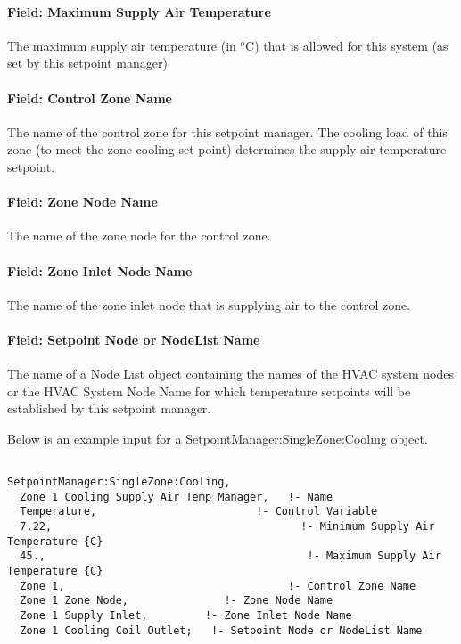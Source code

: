 \paragraph{Field: Maximum Supply Air Temperature}\label{field-maximum-supply-air-temperature-2}

The maximum supply air temperature (in \(^{o}\)C) that is allowed for this system (as set by this setpoint manager)

\paragraph{Field: Control Zone Name}\label{field-control-zone-name-2}

The name of the control zone for this setpoint manager. The cooling load of this zone (to meet the zone cooling set point) determines the supply air temperature setpoint.

\paragraph{Field: Zone Node Name}\label{field-zone-node-name-2}

The name of the zone node for the control zone.

\paragraph{Field: Zone Inlet Node Name}\label{field-zone-inlet-node-name-2}

The name of the zone inlet node that is supplying air to the control zone.

\paragraph{Field: Setpoint Node or NodeList Name}\label{field-setpoint-node-or-nodelist-name-5}

The name of a Node List object containing the names of the HVAC system nodes or the HVAC System Node Name for which temperature setpoints will be established by this setpoint manager.

Below is an example input for a SetpointManager:SingleZone:Cooling object.

\begin{lstlisting}

SetpointManager:SingleZone:Cooling,
  Zone 1 Cooling Supply Air Temp Manager,   !- Name
  Temperature,                         !- Control Variable
  7.22,                                       !- Minimum Supply Air Temperature {C}
  45.,                                         !- Maximum Supply Air Temperature {C}
  Zone 1,                                   !- Control Zone Name
  Zone 1 Zone Node,               !- Zone Node Name
  Zone 1 Supply Inlet,         !- Zone Inlet Node Name
  Zone 1 Cooling Coil Outlet;   !- Setpoint Node or NodeList Name
\end{lstlisting}

